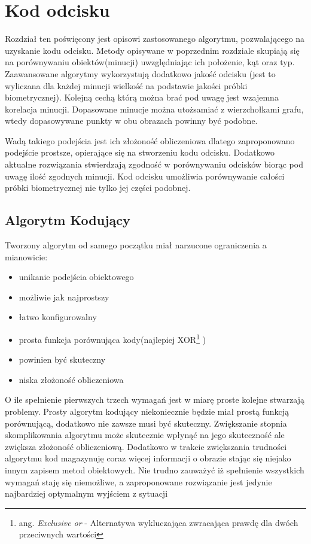 \chapter{Kod odcisku}

Rozdział ten poświęcony jest opisowi zastosowanego algorytmu, pozwalającego na uzyskanie kodu odcisku.
Metody opisywane w poprzednim rozdziale skupiają się na porównywaniu obiektów(minucji) uwzględniając ich położenie, kąt oraz typ. 
Zaawansowane algorytmy wykorzystują dodatkowo jakość odcisku (jest to wyliczana dla każdej minucji wielkość na podstawie 
jakości próbki biometrycznej). Kolejną cechą którą można brać pod uwagę jest wzajemna korelacja minucji. Dopasowane minucje
można utożsamiać z wierzchołkami grafu, wtedy dopasowywane punkty w obu obrazach powinny być podobne. 

Wadą takiego podejścia jest ich złożoność obliczeniowa dlatego zaproponowano podejście prostsze, opierające się 
na stworzeniu kodu odcisku. Dodatkowo aktualne rozwiązania stwierdzają zgodność w porównywaniu odcisków biorąc pod uwagę ilość zgodnych minucji.
Kod odcisku umożliwia porównywanie całości próbki biometrycznej nie tylko jej części podobnej.

\section[Algorytm Kodujący][Algorytm Kodujący]{Algorytm Kodujący}

Tworzony algorytm od samego początku miał narzucone ograniczenia a mianowicie:
\renewcommand*{\labelitemi}{\bullet}
\begin{itemize}
\item unikanie podejścia obiektowego
\item możliwie jak najprostszy 
\item łatwo konfigurowalny
\item prosta funkcja porównująca kody(najlepiej XOR\footnote{ang. {\em Exclusive or} - Alternatywa wykluczająca zwracająca prawdę dla dwóch przeciwnych wartości} )
\item powinien być skuteczny
\item niska złożoność obliczeniowa
\end{itemize}
\vspace{.5cm}\par

O ile spełnienie pierwszych trzech wymagań jest w miarę proste kolejne stwarzają problemy. Prosty algorytm kodujący niekoniecznie będzie miał prostą funkcją porównującą, dodatkowo nie zawsze musi być 
skuteczny. Zwiększanie stopnia skomplikowania algorytmu może skutecznie wpłynąć na jego skuteczność ale zwiększa złożoność obliczeniową. Dodatkowo w trakcie zwiększania trudności algorytmu kod magazynuję
coraz więcej informacji o obrazie stając się niejako innym zapisem metod obiektowych. Nie trudno zauważyć iż spełnienie wszystkich wymagań staję się niemożliwe, a zaproponowane rozwiązanie jest jedynie
najbardziej optymalnym wyjściem z sytuacji

